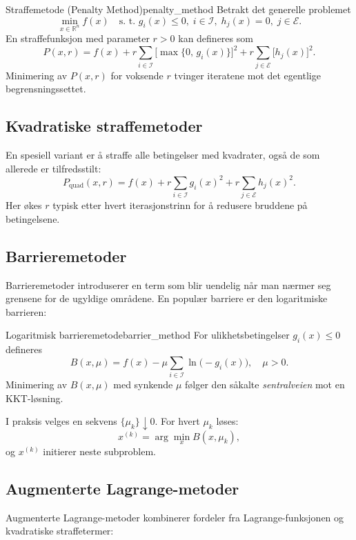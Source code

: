 \begin{definition}{Straffemetode (Penalty Method)}{penalty_method}
    Betrakt det generelle problemet
    \[
        \min_{x\in\mathbb{R}^n} f(x)
        \quad
        \text{s. t. }
        g_i(x)\le0,\;i\in\mathcal I,
        \;
        h_j(x)=0,\;j\in\mathcal E.
    \]
    En straffefunksjon med parameter \(r>0\) kan defineres som
    \[
        P(x,r)
        = f(x)
        + r\sum_{i\in\mathcal I}\bigl[\max\{0,\,g_i(x)\}\bigr]^2
        + r\sum_{j\in\mathcal E}\bigl[h_j(x)\bigr]^2.
    \]
    Minimering av \(P(x,r)\) for voksende \(r\) tvinger iteratene mot det egentlige begrensningssettet.
\end{definition}

\subsection{Kvadratiske straffemetoder}
En spesiell variant er å straffe alle betingelser med kvadrater, også de som allerede er tilfredsstilt:
\[
    P_{\mathrm{quad}}(x,r)
    = f(x)
    + r\sum_{i\in\mathcal I} g_i(x)^2
    + r\sum_{j\in\mathcal E} h_j(x)^2.
\]
Her økes \(r\) typisk etter hvert iterasjonstrinn for å redusere bruddene på betingelsene.

\subsection{Barrieremetoder}
Barrieremetoder introduserer en term som blir uendelig når man nærmer seg grensene for de ugyldige områdene. En populær barriere er den logaritmiske barrieren:

\begin{definition}{Logaritmisk barrieremetode}{barrier_method}
    For ulikhetsbetingelser \(g_i(x)\le0\) defineres
    \[
        B(x,\mu)
        = f(x)
        - \mu\sum_{i\in\mathcal I}\ln\bigl(-g_i(x)\bigr),
        \quad \mu>0.
    \]
    Minimering av \(B(x,\mu)\) med synkende \(\mu\) følger den såkalte \emph{sentralveien} mot en KKT-løsning.
\end{definition}

I praksis velges en sekvens \(\{\mu_k\}\downarrow0\). For hvert \(\mu_k\) løses:
\[
    x^{(k)} = \arg\min_x B(x,\mu_k),
\]
og \(x^{(k)}\) initierer neste subproblem.

\subsection{Augmenterte Lagrange-metoder}
Augmenterte Lagrange-metoder kombinerer fordeler fra Lagrange-funksjonen og kvadratiske straffetermer:

